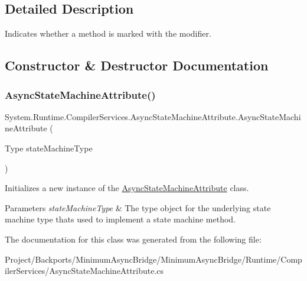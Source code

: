 \subsection{Detailed Description}
Indicates whether a method is marked with the  modifier. 



\subsection{Constructor \& Destructor Documentation}
\mbox{\label{class_system_1_1_runtime_1_1_compiler_services_1_1_async_state_machine_attribute_a8e202c630389a1f224dbf15c66b50852}} 
\subsubsection{\texorpdfstring{Async\+State\+Machine\+Attribute()}{AsyncStateMachineAttribute()}}
{\footnotesize\ttfamily System.\+Runtime.\+Compiler\+Services.\+Async\+State\+Machine\+Attribute.\+Async\+State\+Machine\+Attribute (\begin{DoxyParamCaption}\item[{Type}]{state\+Machine\+Type }\end{DoxyParamCaption})\hspace{0.3cm}{\ttfamily [inline]}}



Initializes a new instance of the \hyperlink{class_system_1_1_runtime_1_1_compiler_services_1_1_async_state_machine_attribute}{Async\+State\+Machine\+Attribute} class. 


\begin{DoxyParams}{Parameters}
{\em state\+Machine\+Type} & The type object for the underlying state machine type that\textquotesingle{}s used to implement a state machine method. \\
\hline
\end{DoxyParams}


The documentation for this class was generated from the following file\+:\begin{DoxyCompactItemize}
\item 
Project/\+Backports/\+Minimum\+Async\+Bridge/\+Minimum\+Async\+Bridge/\+Runtime/\+Compiler\+Services/Async\+State\+Machine\+Attribute.\+cs\end{DoxyCompactItemize}
